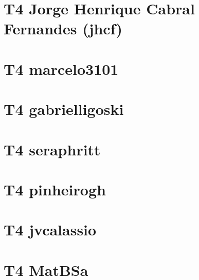 \chapter{T4 Jorge Henrique Cabral Fernandes (jhcf)}



\chapter{T4 marcelo3101}



\chapter{T4 gabrielligoski}



\chapter{T4 seraphritt}



\chapter{T4 pinheirogh}



\chapter{T4 jvcalassio}


\chapter{T4 MatBSa}


